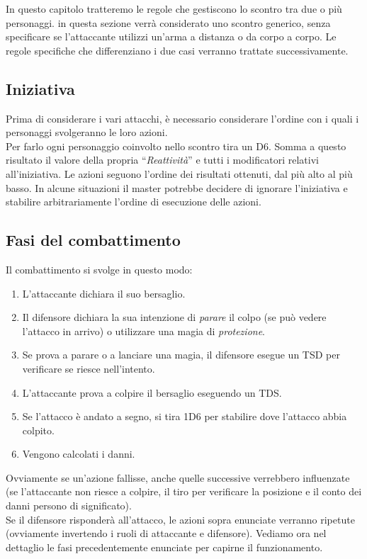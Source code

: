 \documentclass[../manuale_main.tex]{subfiles}
\begin{document}
In questo capitolo tratteremo le regole che gestiscono lo scontro tra due o più personaggi. in questa sezione verrà considerato uno scontro generico, senza specificare se l'attaccante utilizzi un'arma a distanza o da corpo a corpo. Le regole specifiche che differenziano i due casi verranno trattate successivamente.\\

\subsection{Iniziativa}
Prima di considerare i vari attacchi, è necessario considerare l'ordine con i quali i personaggi svolgeranno le loro azioni.\\
Per farlo ogni personaggio coinvolto nello scontro tira un D6. Somma a questo risultato il valore della propria ``\emph{Reattività}'' e tutti i modificatori relativi all'iniziativa. Le azioni seguono l'ordine dei risultati ottenuti, dal più alto al più basso.
In alcune situazioni il master potrebbe decidere di ignorare l'iniziativa e stabilire arbitrariamente l'ordine di esecuzione delle azioni.

\subsection{Fasi del combattimento}
Il combattimento si svolge in questo modo:
\begin{enumerate}
\item L'attaccante dichiara il suo bersaglio.
\item Il difensore dichiara la sua intenzione di \emph{parare} il colpo (se può vedere l'attacco in arrivo) o utilizzare una magia di \emph{protezione}.
\item Se prova a parare o a lanciare una magia, il difensore esegue un TSD per verificare se riesce nell'intento.
\item L'attaccante prova a colpire il bersaglio eseguendo un TDS.
\item Se l'attacco è andato a segno, si tira 1D6 per stabilire dove l'attacco abbia colpito.
\item Vengono calcolati i danni.
\end{enumerate} 
Ovviamente se un'azione fallisse, anche quelle successive verrebbero influenzate (se l'attaccante non riesce a colpire, il tiro per verificare la posizione e il conto dei danni persono di significato).\\
Se il difensore risponderà all'attacco, le azioni sopra enunciate verranno ripetute (ovviamente invertendo i ruoli di attaccante e difensore).
Vediamo ora nel dettaglio le fasi precedentemente enunciate per capirne il funzionamento.
\end{document}

